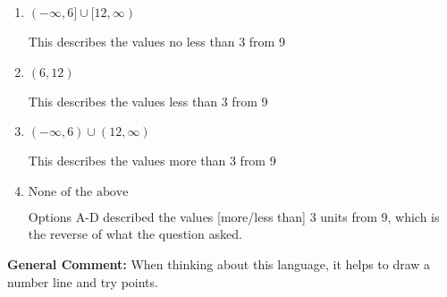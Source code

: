 \documentclass{extbook}[14pt]
\begin{document}
\begin{enumerate}
{\begin{enumerate}[label=\Alph*.]
This describes the values no more than 3 from 9
\item \( (-\infty, 6] \cup [12, \infty) \)

This describes the values no less than 3 from 9
\item \( (6, 12) \)

This describes the values less than 3 from 9
\item \( (-\infty, 6) \cup (12, \infty) \)

This describes the values more than 3 from 9
\item \( \text{None of the above} \)

Options A-D described the values [more/less than] 3 units from 9, which is the reverse of what the question asked.
\end{enumerate}

\textbf{General Comment:} When thinking about this language, it helps to draw a number line and try points.
}
\end{enumerate}
\end{document}
